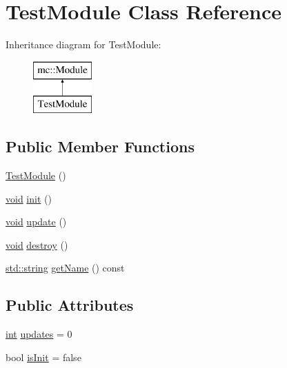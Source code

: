 \hypertarget{class_test_module}{}\section{Test\+Module Class Reference}
\label{class_test_module}
Inheritance diagram for Test\+Module\+:\begin{figure}[H]
\begin{center}
\leavevmode
\includegraphics[height=2.000000cm]{class_test_module}
\end{center}
\end{figure}
\subsection*{Public Member Functions}
\begin{DoxyCompactItemize}
\item 
\hyperlink{class_test_module_a945295de6c98244a5dcb47278a58dd15}{Test\+Module} ()
\item 
\hyperlink{_s_d_l__opengles2__gl2ext_8h_ae5d8fa23ad07c48bb609509eae494c95}{void} \hyperlink{class_test_module_a06a3a2e4ff5b7890ed209f56472108a6}{init} ()
\item 
\hyperlink{_s_d_l__opengles2__gl2ext_8h_ae5d8fa23ad07c48bb609509eae494c95}{void} \hyperlink{class_test_module_a190147fb3851743518bc0e5773e4af3e}{update} ()
\item 
\hyperlink{_s_d_l__opengles2__gl2ext_8h_ae5d8fa23ad07c48bb609509eae494c95}{void} \hyperlink{class_test_module_a58609817f503e9ca6e4fbb13282bb19a}{destroy} ()
\item 
\hyperlink{_s_d_l__opengl__glext_8h_ae84541b4f3d8e1ea24ec0f466a8c568b}{std\+::string} \hyperlink{class_test_module_a1786c36358b0efcb5175a237cf331a5f}{get\+Name} () const 
\end{DoxyCompactItemize}
\subsection*{Public Attributes}
\begin{DoxyCompactItemize}
\item 
\hyperlink{_s_d_l__thread_8h_a6a64f9be4433e4de6e2f2f548cf3c08e}{int} \hyperlink{class_test_module_a73f9b41d990edf8c2b38520e415d1e93}{updates} = 0
\item 
bool \hyperlink{class_test_module_a0bd38f46510f0e2a48645aafa8fb99fc}{is\+Init} = false
\end{DoxyCompactItemize}
